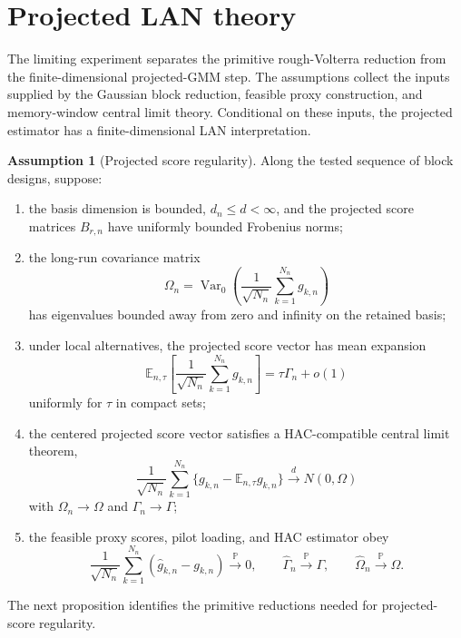 \documentclass[11pt,a4paper]{amsart}
\theoremstyle{plain}
\theoremstyle{definition}
\newtheorem{assumption}[theorem]{Assumption}
\theoremstyle{remark}
\DeclareMathOperator{\Var}{Var}
\newcommand{\PP}{\mathbb{P}}
\newcommand{\EE}{\mathbb{E}}
\newcommand{\toP}{\xrightarrow{\PP}}
\newcommand{\toD}{\xrightarrow{d}}
\begin{document}
\section{Projected LAN theory}\label{sec:projected-lan}

The limiting experiment separates the primitive rough-Volterra reduction from the
finite-dimensional projected-GMM step.  The assumptions collect the inputs supplied by the Gaussian
block reduction, feasible proxy construction, and memory-window central limit theory.  Conditional
on these inputs, the projected estimator has a finite-dimensional LAN interpretation.

\begin{assumption}[Projected score regularity]\label{ass:pcov-regularity}
Along the tested sequence of block designs, suppose:
\begin{enumerate}[label=(\alph*)]
\item the basis dimension is bounded, \(d_n\le d<\infty\), and the projected score matrices
\(B_{r,n}\) have uniformly bounded Frobenius norms;
\item the long-run covariance matrix
\[
        \Omega_n=\Var_{0}\left(\frac1{\sqrt{N_n}}\sum_{k=1}^{N_n}g_{k,n}\right)
\]
has eigenvalues bounded away from zero and infinity on the retained basis;
\item under local alternatives, the projected score vector has mean expansion
\[
        \EE_{n,\tau}\left[\frac1{\sqrt{N_n}}\sum_{k=1}^{N_n}g_{k,n}\right]
        =
        \tau\Gamma_n+o(1)
\]
uniformly for \(\tau\) in compact sets;
\item the centered projected score vector satisfies a HAC-compatible central limit theorem,
\[
        \frac1{\sqrt{N_n}}\sum_{k=1}^{N_n}
        \{g_{k,n}-\EE_{n,\tau}g_{k,n}\}
        \toD
        N(0,\Omega)
\]
with \(\Omega_n\to\Omega\) and \(\Gamma_n\to\Gamma\);
\item the feasible proxy scores, pilot loading, and HAC estimator obey
\[
        \frac1{\sqrt{N_n}}\sum_{k=1}^{N_n}
        (\widehat g_{k,n}-g_{k,n})\toP 0,
        \qquad
        \widehat\Gamma_n\toP\Gamma,
        \qquad
        \widehat\Omega_n\toP\Omega.
\]
\end{enumerate}
\end{assumption}

The next proposition identifies the primitive reductions needed for projected-score regularity.
\end{document}
